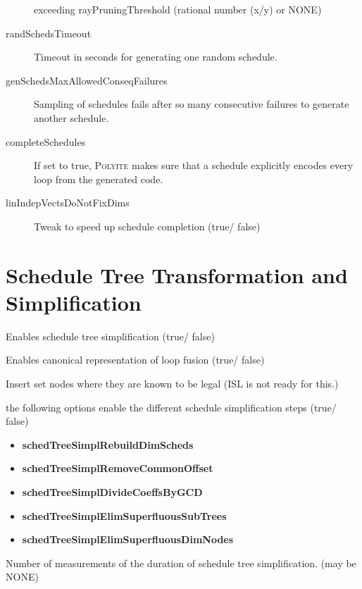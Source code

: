 \documentclass{article}
\begin{document}
\begin{description}
    exceeding rayPruningThreshold (rational number (x/y) or NONE)
    \item[randSchedsTimeout] Timeout in seconds for generating one random schedule.
    \item[genSchedsMaxAllowedConseqFailures] Sampling of schedules fails after
    so many consecutive failures to generate another schedule.
    \item[completeSchedules] If set to true, \textsc{Polyite} makes sure that a schedule
    explicitly encodes every loop from the generated code.
    \item[linIndepVectsDoNotFixDims] Tweak to speed up schedule completion (true/ false)
  \end{description}

    \section{Schedule Tree Transformation and Simplification}
    \begin{description}
      \item[simplifySchedTrees] Enables schedule tree simplification (true/ false)
      \item[splitLoopBodies] Enables canonical representation of loop fusion (true/ false)
      \item[insertSetNodes] Insert set nodes where they are known to be legal (ISL is not ready for this.)

      \item the following options enable the different schedule simplification steps (true/ false)
      \begin{itemize}
      \item \textbf{schedTreeSimplRebuildDimScheds}
      \item \textbf{schedTreeSimplRemoveCommonOffset}
      \item \textbf{schedTreeSimplDivideCoeffsByGCD}
      \item \textbf{schedTreeSimplElimSuperfluousSubTrees}
      \item \textbf{schedTreeSimplElimSuperfluousDimNodes}
    \end{itemize}
      \item[numSchedTreeSimplDurationMeasurements] Number of measurements of the
      duration of schedule tree simplification. (may be NONE)
    \end{description}
\end{document}
